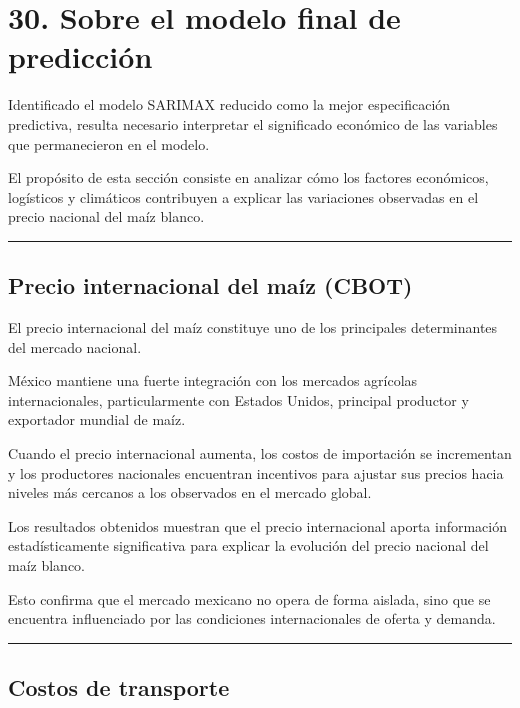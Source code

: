 \documentclass[11pt]{article}
\begin{document}
    \hypertarget{sobre-el-modelo-final-de-predicciuxf3n}{%
\section{30. Sobre el modelo final de
predicción}\label{sobre-el-modelo-final-de-predicciuxf3n}}

Identificado el modelo SARIMAX reducido como la mejor especificación
predictiva, resulta necesario interpretar el significado económico de
las variables que permanecieron en el modelo.

El propósito de esta sección consiste en analizar cómo los factores
económicos, logísticos y climáticos contribuyen a explicar las
variaciones observadas en el precio nacional del maíz blanco.

\begin{center}\rule{0.5\linewidth}{0.5pt}\end{center}

\hypertarget{precio-internacional-del-mauxedz-cbot}{%
\subsection{Precio internacional del maíz
(CBOT)}\label{precio-internacional-del-mauxedz-cbot}}

El precio internacional del maíz constituye uno de los principales
determinantes del mercado nacional.

México mantiene una fuerte integración con los mercados agrícolas
internacionales, particularmente con Estados Unidos, principal productor
y exportador mundial de maíz.

Cuando el precio internacional aumenta, los costos de importación se
incrementan y los productores nacionales encuentran incentivos para
ajustar sus precios hacia niveles más cercanos a los observados en el
mercado global.

Los resultados obtenidos muestran que el precio internacional aporta
información estadísticamente significativa para explicar la evolución
del precio nacional del maíz blanco.

Esto confirma que el mercado mexicano no opera de forma aislada, sino
que se encuentra influenciado por las condiciones internacionales de
oferta y demanda.

\begin{center}\rule{0.5\linewidth}{0.5pt}\end{center}

\hypertarget{costos-de-transporte}{%
\subsection{Costos de transporte}\label{costos-de-transporte}}
\end{document}
